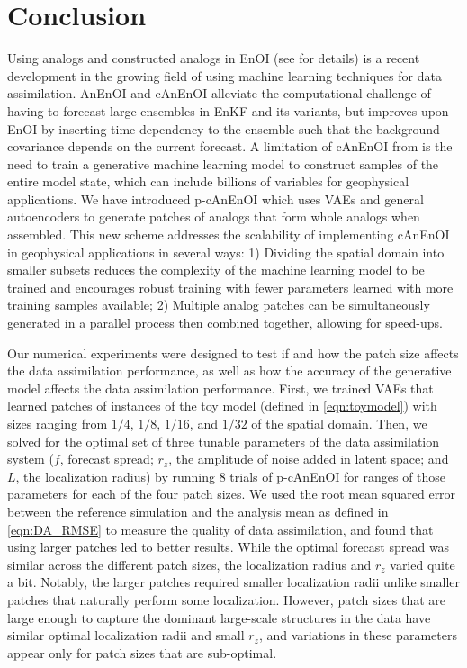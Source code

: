 \documentclass[final,3p]{elsarticle}
\theoremstyle{break}
\begin{document}
\section{Conclusion}\label{sec:conclusion}
Using analogs and constructed analogs in EnOI (see \cite{grooms2020analog} for details) is a recent development in the growing field of using machine learning techniques for data assimilation.
AnEnOI and cAnEnOI alleviate the computational challenge of having to forecast large ensembles in EnKF and its variants, but improves upon EnOI by inserting time dependency to the ensemble such that the background covariance depends on the current forecast.
A limitation of cAnEnOI from \cite{grooms2020analog} is the need to train a generative machine learning model to construct samples of the entire model state, which can include billions of variables for geophysical applications.
We have introduced p-cAnEnOI which uses VAEs and general autoencoders to generate patches of analogs that form whole analogs when assembled.
This new scheme addresses the scalability of implementing cAnEnOI in geophysical applications in several ways: 1) Dividing the spatial domain into smaller subsets reduces the complexity of the machine learning model to be trained and encourages robust training with fewer parameters learned with more training samples available; 2) Multiple analog patches can be simultaneously generated in a parallel process then combined together, allowing for speed-ups. \par

Our numerical experiments were designed to test if and how the patch size affects the data assimilation performance, as well as how the accuracy of the generative model affects the data assimilation performance.
First, we trained VAEs that learned patches of instances of the toy model (defined in \cref{eqn:toymodel}) with sizes ranging from $1/4$, $1/8$, $1/16$, and $1/32$ of the spatial domain.%
Then, we solved for the optimal set of three tunable parameters of the data assimilation system ($f$, forecast spread; $r_z$, the amplitude of noise added in latent space; and $L$, the localization radius) by running 8 trials of p-cAnEnOI for ranges of those parameters for each of the four patch sizes. 
We used the root mean squared error between the reference simulation and the analysis mean as defined in \cref{eqn:DA_RMSE} to measure the quality of data assimilation, and found that using larger patches led to better results. 
While the optimal forecast spread was similar across the different patch sizes, the localization radius and $r_z$ varied quite a bit.
Notably, the larger patches required smaller localization radii unlike smaller patches that naturally perform some localization. 
However, patch sizes that are large enough to capture the dominant large-scale structures in the data have similar optimal localization radii and small $r_z$, and variations in these parameters appear only for patch sizes that are sub-optimal. \par
\end{document}
